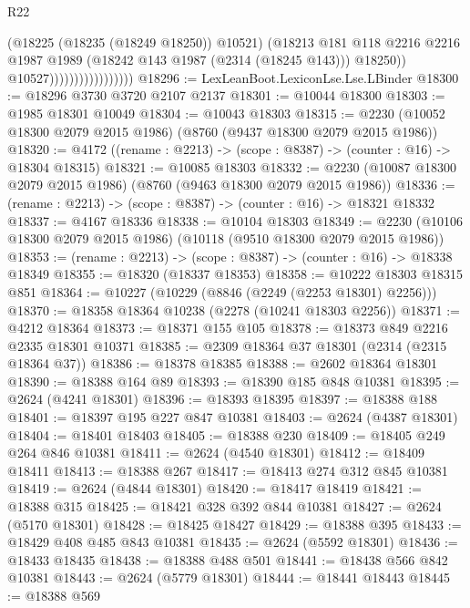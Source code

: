 \begin{lexlean}{R22}
\begin{coremodule}
                                        (@18225 (@18235 (@18249 @18250)) @10521)
                                        (@18213
                                          @181
                                          @118
                                          @2216
                                          @2216
                                          @1987
                                          @1989
                                          (@18242 @143 @1987 (@2314 (@18245 @143)))
                                          @18250))
                                      @10527)))))))))))))))))
@18296 := LexLeanBoot.LexiconLse.Lse.LBinder
@18300 := @18296 @3730 @3720 @2107 @2137
@18301 := @10044 @18300
@18303 := @1985 @18301 @10049
@18304 := @10043 @18303
@18315 := @2230 (@10052 @18300 @2079 @2015 @1986) (@8760 (@9437 @18300 @2079 @2015 @1986))
@18320 := @4172 ((rename : @2213) -> (scope : @8387) -> (counter : @16) -> @18304 @18315)
@18321 := @10085 @18303
@18332 := @2230 (@10087 @18300 @2079 @2015 @1986) (@8760 (@9463 @18300 @2079 @2015 @1986))
@18336 := (rename : @2213) -> (scope : @8387) -> (counter : @16) -> @18321 @18332
@18337 := @4167 @18336
@18338 := @10104 @18303
@18349 := @2230 (@10106 @18300 @2079 @2015 @1986) (@10118 (@9510 @18300 @2079 @2015 @1986))
@18353 := (rename : @2213) -> (scope : @8387) -> (counter : @16) -> @18338 @18349
@18355 := @18320 (@18337 @18353)
@18358 := @10222 @18303 @18315 @851
@18364 := @10227 (@10229 (@8846 (@2249 (@2253 @18301) @2256)))
@18370 := @18358 @18364 @10238 (@2278 (@10241 @18303 @2256))
@18371 := @4212 @18364
@18373 := @18371 @155 @105
@18378 := @18373 @849 @2216 @2335 @18301 @10371
@18385 := @2309 @18364 @37 @18301 (@2314 (@2315 @18364 @37))
@18386 := @18378 @18385
@18388 := @2602 @18364 @18301
@18390 := @18388 @164 @89
@18393 := @18390 @185 @848 @10381
@18395 := @2624 (@4241 @18301)
@18396 := @18393 @18395
@18397 := @18388 @188
@18401 := @18397 @195 @227 @847 @10381
@18403 := @2624 (@4387 @18301)
@18404 := @18401 @18403
@18405 := @18388 @230
@18409 := @18405 @249 @264 @846 @10381
@18411 := @2624 (@4540 @18301)
@18412 := @18409 @18411
@18413 := @18388 @267
@18417 := @18413 @274 @312 @845 @10381
@18419 := @2624 (@4844 @18301)
@18420 := @18417 @18419
@18421 := @18388 @315
@18425 := @18421 @328 @392 @844 @10381
@18427 := @2624 (@5170 @18301)
@18428 := @18425 @18427
@18429 := @18388 @395
@18433 := @18429 @408 @485 @843 @10381
@18435 := @2624 (@5592 @18301)
@18436 := @18433 @18435
@18438 := @18388 @488 @501
@18441 := @18438 @566 @842 @10381
@18443 := @2624 (@5779 @18301)
@18444 := @18441 @18443
@18445 := @18388 @569

\end{coremodule}
\end{lexlean}
